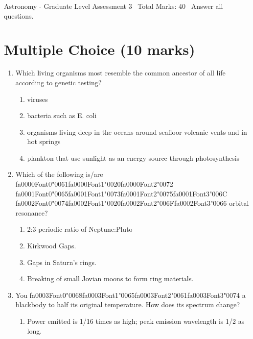 \documentclass[12pt]{article}
\begin{document}
\begin{center}
Astronomy - Graduate Level Assessment 3 \
Total Marks: 40 \
Answer all questions.
\end{center}

\section*{Multiple Choice (10 marks)}
\begin{enumerate}[label=\arabic*.]
\item Which living organisms most resemble the common ancestor of all life according to genetic
testing?
\begin{enumerate}[label=(\alph*)]
    \item viruses
    \item bacteria such as E. coli
    \item organisms living deep in the oceans around seafloor volcanic vents and in hot springs
    \item plankton that use sunlight as an energy source through photosynthesis
\end{enumerate}
\item Which of the following is/are {\csname fa0000Font0\endcsname\char"0061}{\csname fa0000Font1\endcsname\char"0020}{\csname fa0000Font2\endcsname\char"0072} {\csname fa0001Font0\endcsname\char"0065}{\csname fa0001Font1\endcsname\char"0073}{\csname fa0001Font2\endcsname\char"0075}{\csname fa0001Font3\endcsname\char"006C} {\csname fa0002Font0\endcsname\char"0074}{\csname fa0002Font1\endcsname\char"0020}{\csname fa0002Font2\endcsname\char"006F}{\csname fa0002Font3\endcsname\char"0066} orbital resonance?
\begin{enumerate}[label=(\alph*)]
    \item 2:3 periodic ratio of Neptune:Pluto
    \item Kirkwood Gaps.
    \item Gaps in Saturn's rings.
    \item Breaking of small Jovian moons to form ring materials.
\end{enumerate}
\item You {\csname fa0003Font0\endcsname\char"0068}{\csname fa0003Font1\endcsname\char"0065}{\csname fa0003Font2\endcsname\char"0061}{\csname fa0003Font3\endcsname\char"0074} a blackbody to half its original temperature. How does its spectrum change?
\begin{enumerate}[label=(\alph*)]
    \item Power emitted is 1/16 times as high; peak emission wavelength is 1/2 as long.

\end{enumerate}
\end{enumerate}
\end{document}
